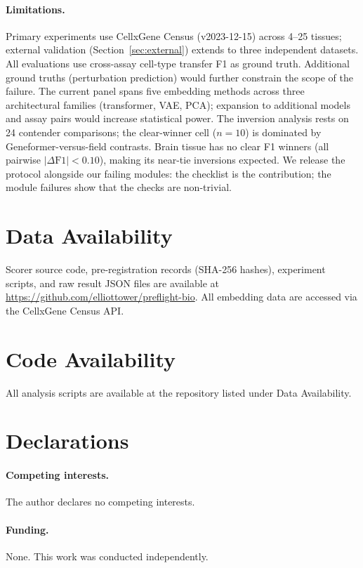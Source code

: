 \documentclass[11pt]{article}
\begin{document}
\paragraph{Limitations.} Primary experiments use CellxGene Census (v2023-12-15) across 4--25 tissues; external validation (Section~\ref{sec:external}) extends to three independent datasets. All evaluations use cross-assay cell-type transfer F1 as ground truth. Additional ground truths (perturbation prediction) would further constrain the scope of the failure. The current panel spans five embedding methods across three architectural families (transformer, VAE, PCA); expansion to additional models and assay pairs would increase statistical power. The inversion analysis rests on 24 contender comparisons; the clear-winner cell ($n = 10$) is dominated by Geneformer-versus-field contrasts. Brain tissue has no clear F1 winners (all pairwise $|\Delta\text{F1}| < 0.10$), making its near-tie inversions expected. We release the protocol alongside our failing modules: the checklist is the contribution; the module failures show that the checks are non-trivial.

\section*{Data Availability}

Scorer source code, pre-registration records (SHA-256 hashes), experiment scripts, and raw result JSON files are available at \url{https://github.com/elliottower/preflight-bio}. All embedding data are accessed via the CellxGene Census API.

\section*{Code Availability}

All analysis scripts are available at the repository listed under Data Availability.

\section*{Declarations}

\paragraph{Competing interests.} The author declares no competing interests.

\paragraph{Funding.} None. This work was conducted independently.
\end{document}
